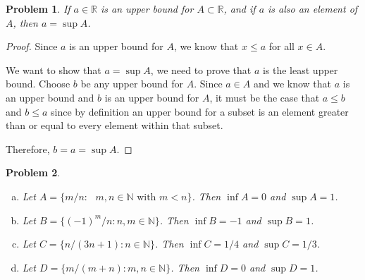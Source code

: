 \documentclass[12pt]{article}
\newtheorem{problem}{Problem}
\newcommand{\RR}{\ensuremath{\mathbb R}}
\newcommand{\NN}{\ensuremath{\mathbb N}}
\begin{document}
\begin{problem} %
If $a\in\RR$ is an upper bound for $A\subset \RR$, and if $a$ is also an element of $A$, then $a = \sup A$.
\end{problem}

\begin{proof}
	Since $a$ is an upper bound for $A$, we know that $x \leq a$ for all $x \in A$.

We want to show that $a = \sup A$, we need to prove that $a$ is the least upper bound. Choose $b$ be any upper bound for $A$. Since $a \in A$ and we know that $a$ is an upper bound and $b$ is an upper bound for $A$, it must be the case that $a \leq b$ and $b \leq a$ since by definition an upper bound for a subset is an element greater than or equal to every element within that subset. 

Therefore, $b = a = \sup A$.
\end{proof}


\begin{problem} %


\begin{enumerate}[(a)]
\item Let $A=\{m/n: \text{ $m,n\in\NN$ with $m<n$} \}$.  Then $\inf A = 0 $ and $\sup A = 1 $.
\item Let $B=\{(-1)^m/n: n,m\in\NN\}$.  Then $\inf B = -1 $ and $\sup B = 1 $.
\item Let $C=\{n/(3n+1): n\in\NN\}$.  Then $\inf C = 1/4 $ and $\sup C = 1/3$.
\item Let $D=\{m/(m+n):m,n\in\NN\}$.  Then $\inf D = 0 $ and $\sup D = 1 $.
\end{enumerate}
\end{problem}
\end{document}
